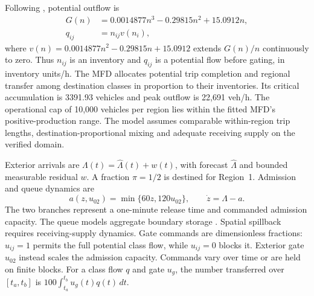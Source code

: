 \documentclass[preprint,12pt]{elsarticle}
\begin{document}
Following \cite{zhong2018robust,geroliminis2013mpc}, potential outflow is
\begin{equation}
\begin{aligned}
G(n)&=0.0014877n^3-0.29815n^2+15.0912n,\\
q_{ij}&=n_{ij}v(n_i),
\end{aligned}
\label{eq:new-mfd}
\end{equation}
where $v(n)=0.0014877n^2-0.29815n+15.0912$ extends $G(n)/n$ continuously
to zero. Thus $n_{ij}$ is an inventory and $q_{ij}$ is a potential flow
before gating, in inventory units/h. The MFD allocates potential trip
completion and regional transfer among destination classes in proportion
to their inventories. Its critical accumulation is 3391.93 vehicles and
peak outflow is 22,691 veh/h. The operational cap of 10,000 vehicles per
region lies within the fitted MFD's positive-production range. The model
assumes comparable within-region trip lengths, destination-proportional
mixing and adequate receiving supply on the verified domain.

Exterior arrivals are $\Lambda(t)=\widehat\Lambda(t)+w(t)$, with forecast
$\widehat\Lambda$ and bounded measurable residual $w$. A fraction
$\pi=1/2$ is destined for Region~1. Admission and queue dynamics are
\begin{equation}
a(z,u_{02})=\min\{60z,120u_{02}\},\qquad
\dot z=\Lambda-a.
\label{eq:new-admission}
\end{equation}
The two branches represent a one-minute release time and commanded
admission capacity. The queue models aggregate boundary storage
\cite{haddad2017queues}. Spatial spillback requires receiving-supply dynamics.
Gate commands are dimensionless fractions: $u_{ij}=1$ permits the full
potential class flow, while $u_{ij}=0$ blocks it. Exterior gate $u_{02}$
instead scales the admission capacity. Commands vary over time or are held
on finite blocks. For a class flow $q$ and gate $u_g$, the number transferred
over $[t_a,t_b]$ is $100\int_{t_a}^{t_b}u_g(t)q(t)\,dt$.
\end{document}
